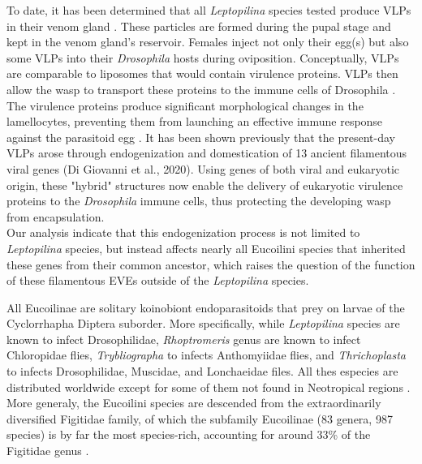 To date, it has been determined that all \textit{Leptopilina} species tested produce VLPs in their venom gland \citep{rizki_parasitoid_1990, morales_biogenesis_2005}.  These particles are formed during the pupal stage and kept in the venom gland's reservoir. Females inject not only their egg(s) but also some VLPs into their \textit{Drosophila} hosts during oviposition. Conceptually, VLPs are comparable to liposomes that would contain virulence proteins. VLPs then allow the wasp to transport these proteins to the immune cells of Drosophila \citep{colinet_convergent_2007}. The virulence proteins produce significant morphological changes in the lamellocytes, preventing them from launching an effective immune response against the parasitoid egg \citep{colinet_convergent_2007}. It has been shown previously that the present-day VLPs arose through endogenization and domestication of 13 ancient filamentous viral genes (Di Giovanni et al., 2020). Using genes of both viral and eukaryotic origin, these "hybrid" structures now enable the delivery of eukaryotic virulence proteins to the \textit{Drosophila} immune cells, thus protecting the developing wasp from encapsulation. \\


Our analysis indicate that this endogenization process is not limited to \textit{Leptopilina} species, but instead affects nearly all Eucoilini species that inherited these genes from their common ancestor, which raises the question of the function of these filamentous EVEs outside of the \textit{Leptopilina} species.

All Eucoilinae are solitary koinobiont endoparasitoids that prey on larvae of the Cyclorrhapha Diptera suborder.
More specifically, while  \textit{Leptopilina} species are known to infect Drosophilidae, \textit{Rhoptromeris} genus are known to infect Chloropidae flies, \textit{Trybliographa} to infects Anthomyiidae flies, and \textit{Thrichoplasta} to infects Drosophilidae, Muscidae, and Lonchaeidae files. All thes especies are distributed worldwide except for some of them not found in Neotropical regions \citep{nordlander_identities_1982}. More generaly, the Eucoilini species are descended from the extraordinarily diversified Figitidae family, of which the subfamily Eucoilinae (83 genera, 987 species) is by far the most species-rich, accounting for around 33\% of the Figitidae genus \citep{fontal-cazalla_phylogeny_2002,ronquist_phylogeny_1995,ronquist_phylogeny_2015}.


